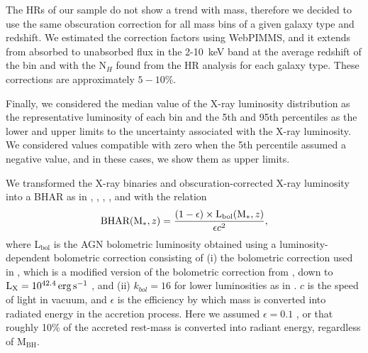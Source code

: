 The HRs of our sample do not show a trend with mass, therefore we decided to use the same obscuration correction for all mass bins of a given galaxy type and redshift.
We estimated the correction factors using WebPIMMS, and it extends from absorbed to unabsorbed flux in the 2-10~keV band at the average redshift of the bin and with the N$_H$ found from the HR analysis for each galaxy type. These corrections are approximately $5-10\%$.

Finally, we considered the median value of the X-ray luminosity distribution as the representative luminosity of each bin and the 5th and 95th percentiles as the lower and upper limits to the uncertainty associated with the X-ray luminosity. We considered values compatible with zero when the 5th percentile assumed a negative value, and in these cases, we show them as upper limits. 




We transformed the X-ray binaries and obscuration-corrected X-ray luminosity into a BHAR as in \citet{2008MNRAS.388.1011M}, \citet{2012ApJ...753L..30M}, \citet{2014MNRAS.439.2736D}, \citet{2015ApJ...800L..10R}, and \citet{2018ApJ...857...64B} with the relation
\begin{equation}  \label{eq:BHAR}
\centering
\text{BHAR}(\text{M}_*,z)=\frac{(1-\epsilon)\times\text{L}_{\text{bol}}(\text{M}_*,z)}{\epsilon c^2},
\end{equation}
where L$_{\text{bol}}$ is the AGN bolometric luminosity obtained using a luminosity-dependent bolometric correction consisting of (i) the bolometric correction used in \citet{2018MNRAS.475.1887Y}, which is a modified version of the bolometric correction from \citet{2012MNRAS.425..623L}, down to $\text{L}_\text{X}=10^{42.4} \,\mathrm{erg}\,\mathrm{s}^{-1}$ , and (ii) $k_{bol}=16$ for lower luminosities as in \citet{2017ApJ...842..131S}.
$c$ is the speed of light in vacuum, and $\epsilon$ is the efficiency by which mass is converted into radiated energy in the accretion process. Here we assumed $\epsilon=0.1$ \citep[e.g.,][]{2004MNRAS.351..169M, 2012ApJ...753L..30M, 2015ApJ...800L..10R, 2018ApJ...857...64B}, or that roughly 10\% of the accreted rest-mass is converted into radiant energy, regardless of M$_\text{BH}$.

